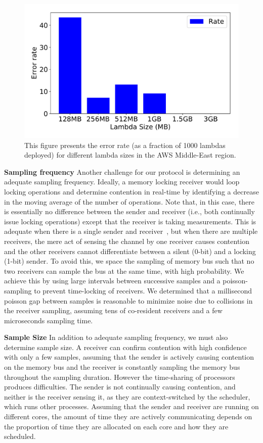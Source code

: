 \begin{figure}[!t]
  \includegraphics[width=.99\linewidth]{fig/errorrates.pdf}
  \caption{This figure presents the error rate (as a fraction of 1000 lambdas
  deployed) for different lambda sizes in the AWS Middle-East region.
\label{fig:errorrates}}
\end{figure}


\textbf{Sampling frequency}
\label{sec:method:listen:freq}
Another challenge for our protocol is determining an adequate sampling
frequency. Ideally, a memory locking receiver would loop locking operations and
determine contention in real-time by identifying a decrease in the moving
average of the number of operations. Note that, in this case, there is
essentially no difference between the sender and receiver (i.e., both
continually issue locking operations) except that the receiver is taking
measurements. This is adequate when there is a single sender and
receiver~\cite{varadarajan2015}, but when there are multiple receivers, the mere
act of sensing the channel by one receiver causes contention and the other receivers
cannot differentiate between a silent (0-bit) and a locking (1-bit) sender. To
avoid this, we space the sampling of memory bus such that no two receivers can 
sample the bus at the same time, with high probability. We achieve this by
using large intervals between successive samples and a poisson-sampling to
prevent time-locking of receivers. We determined that a millisecond poisson gap
between samples is reasonable to minimize noise due to collisions in the receiver
sampling, assuming tens of co-resident receivers and a few
microseconds sampling time.

\textbf{Sample Size} 
\label{sec:method:samplingdur}
In addition to adequate sampling frequency, we must also determine sample size.  
A receiver can confirm contention with high confidence with only a
few samples, assuming that the sender is actively causing contention on the
memory bus and the receiver is constantly sampling the memory bus throughout the
sampling duration. However the time-sharing of processors
produces difficulties. The sender is not continually causing contention, and
neither is the receiver sensing it, as they are context-switched by the
scheduler, which runs other processes. Assuming that the sender and receiver are
running on different cores, the amount of time they are actively communicating
depends on the proportion of time they are allocated on each core and how they
are scheduled. 

